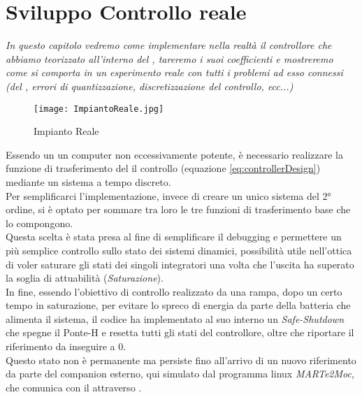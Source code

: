 \chapter{Sviluppo Controllo reale}\label{cap:controlDevelop}

\begin{minipage}{12cm}\textit{
		In questo capitolo vedremo come implementare nella realtà il controllore che abbiamo teorizzato all'interno del \microControllore, tareremo i suoi coefficienti e mostreremo come si comporta in un esperimento reale con tutti i problemi ad esso connessi (\nonLinearita del \cite*{IBT-2}, errori di quantizzazione, discretizzazione del controllo, ecc...)
	}
\end{minipage}

\vspace*{1cm}

\begin{figure}[H]
	\centering
	\caption[Impianto Reale]{Impianto Reale}
	\texttt{[image: ImpiantoReale.jpg]}
\end{figure}

\newpage
\noindent
Essendo un \microControllore un computer non eccessivamente potente, è necessario realizzare la funzione di trasferimento del il controllo (equazione \ref{eq:controllerDesign}) mediante un sistema a tempo discreto.\\
Per semplificarci l'implementazione, invece di creare un unico sistema del 2° ordine, si è optato per sommare tra loro le tre funzioni di trasferimento base che lo compongono.\\
Questa scelta è stata presa al fine di semplificare il debugging e permettere un più semplice controllo sullo stato dei sistemi dinamici, possibilità utile nell'ottica di voler saturare gli stati dei singoli integratori una volta che l'uscita ha superato la soglia di attuabilità (\textit{Saturazione}).\\
In fine, essendo l'obiettivo di controllo realizzato da una rampa, dopo un certo tempo in saturazione, per evitare lo spreco di energia da parte della batteria che alimenta il sistema, il codice ha implementato al suo interno un \textit{Safe-Shutdown} che spegne il Ponte-H e resetta tutti gli stati del controllore, oltre che riportare il riferimento da inseguire a 0.\\
Questo stato non è permanente ma persiste fino all'arrivo di un nuovo riferimento da parte del companion esterno, qui simulato dal programma linux \textit{MARTe2Moc}, che comunica con il \microControllore attraverso \cite*{EMP}.

